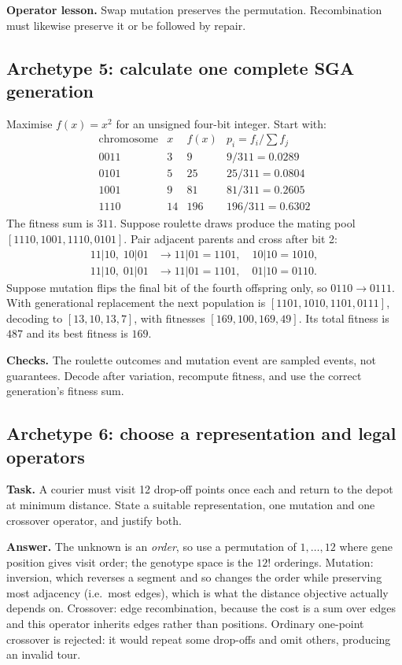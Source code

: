 \documentclass[11pt,a4paper]{article}
\begin{document}
\textbf{Operator lesson.} Swap mutation preserves the permutation. Recombination must likewise preserve it or be followed by repair.

\subsection{Archetype 5: calculate one complete SGA generation}
Maximise $f(x)=x^2$ for an unsigned four-bit integer. Start with:
\[
\begin{array}{c|c|c|c}
\text{chromosome}&x&f(x)&p_i=f_i/\sum f_j\\
\hline
0011&3&9&9/311=0.0289\\
0101&5&25&25/311=0.0804\\
1001&9&81&81/311=0.2605\\
1110&14&196&196/311=0.6302
\end{array}
\]
The fitness sum is $311$. Suppose roulette draws produce the mating pool
$[1110,1001,1110,0101]$. Pair adjacent parents and cross after bit 2:
\[
\begin{aligned}
11|10,\;10|01&\longrightarrow 11|01=1101,\quad 10|10=1010,\\
11|10,\;01|01&\longrightarrow 11|01=1101,\quad 01|10=0110.
\end{aligned}
\]
Suppose mutation flips the final bit of the fourth offspring only, so $0110\to0111$. With generational replacement the next population is
$[1101,1010,1101,0111]$, decoding to $[13,10,13,7]$, with fitnesses $[169,100,169,49]$. Its total fitness is $487$ and its best fitness is $169$.

\textbf{Checks.} The roulette outcomes and mutation event are sampled events, not guarantees. Decode after variation, recompute fitness, and use the correct generation's fitness sum.


\subsection{Archetype 6: choose a representation and legal operators}
\textbf{Task.} A courier must visit 12 drop-off points once each and return to
the depot at minimum distance. State a suitable representation, one mutation
and one crossover operator, and justify both.

\textbf{Answer.} The unknown is an \emph{order}, so use a permutation of
$1,\ldots,12$ where gene position gives visit order; the genotype space is the
$12!$ orderings. Mutation: inversion, which reverses a segment and so changes
the order while preserving most adjacency (i.e.\ most edges), which is what
the distance objective actually depends on. Crossover: edge recombination,
because the cost is a sum over edges and this operator inherits edges rather
than positions. Ordinary one-point crossover is rejected: it would repeat some
drop-offs and omit others, producing an invalid tour.
\end{document}
